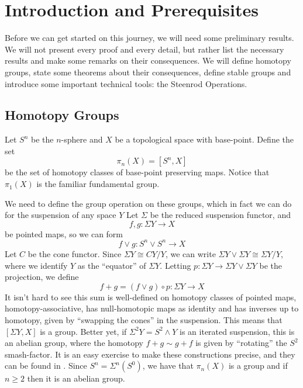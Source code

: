 \section{Introduction and Prerequisites}

Before we can get started on this journey, we will need some preliminary results.  
We will not present every proof and every detail, but rather list the necessary results and make some remarks on their consequences. 
We will define homotopy groups, state some theorems about their consequences, define stable groups and introduce some important technical tools: the Steenrod Operations.

\subsection{Homotopy Groups}

\begin{Def}
  Let $S^n$ be the $n$-sphere and $X$ be a topological space with base-point.  
  Define the set 
  \[\pi_n(X)=[S^n,X]\]
  be the set of homotopy classes of base-point preserving maps.  
  Notice that $\pi_1(X)$ is the familiar fundamental group.  
\end{Def}

We need to define the group operation on these groups, which in fact we can do for the suspension of any space $Y$
Let $\Sigma$ be the reduced suspension functor, and 
\[f,g:\Sigma Y\to X\]
be pointed maps, so we can form
\[f\vee g :S^n\vee S^n\to X\]
Let $C$ be the cone functor.  
Since $\Sigma Y\cong CY/Y$, we can write $\Sigma Y\vee \Sigma Y\cong \Sigma Y/Y$, where we identify $Y$ as the ``equator'' of $\Sigma Y$.  
Letting $p: \Sigma Y\to \Sigma Y\vee \Sigma Y$ be the projection, we define
\[f+g=(f\vee g)\circ p : \Sigma Y\to X\]
It isn't hard to see this sum is well-defined on homotopy classes of pointed maps, homotopy-associative, has null-homotopic maps as identity and 
has inverses up to homotopy, given by ``swapping the cones'' in the suspension.
This means that $[\Sigma Y,X]$ is a group.  
Better yet, if $\Sigma^2Y=S^2\wedge Y$ is an iterated suspension, this is an abelian group, where the homotopy $f+g\sim g+f$ is given by ``rotating'' the $S^2$ smash-factor.  
It is an easy exercise to make these constructions precise, and they can be found in \cite{HatcherAT}.  Since $S^n=\Sigma^n(S^0)$, we have that $\pi_n(X)$ is a group and if $n\ge 2$ then it is an abelian group.  

